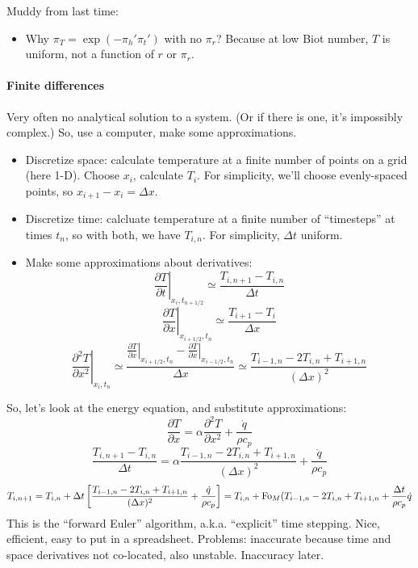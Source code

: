 \documentclass{report}
\begin{document}
\noindent Muddy from last time:
\begin{itemize}
\item Why $\pi_T=\exp(-\pi_h'\pi_t')$ with no $\pi_r$?  Because at low Biot
  number, $T$ is uniform, not a function of $r$ or $\pi_r$.
\end{itemize}

\paragraph{Finite differences}
Very often no analytical solution to a system.  (Or if there is one, it's
impossibly complex.)  So, use a computer, make some approximations.
\begin{itemize}
\item Discretize space: calculate temperature at a finite number of points on a
  grid (here 1-D).  Choose $x_i$, calculate $T_i$.  For simplicity, we'll
  choose evenly-spaced points, so $x_{i+1}-x_i=\Delta x$.
\item Discretize time: calcluate temperature at a finite number of
  ``timesteps'' at times $t_n$, so with both, we have $T_{i,n}$.  For
  simplicity, $\Delta t$ uniform.
\item Make some approximations about derivatives:
  $$\left.\frac{\partial T}{\partial t}\right|_{x_i, t_{n+1/2}} \simeq
  \frac{T_{i,n+1} - T_{i,n}}{\Delta t}$$
  $$\left.\frac{\partial T}{\partial x}\right|_{x_{i+1/2}, t_n} \simeq
  \frac{T_{i+1}-T_i}{\Delta x}$$
  $$\left.\frac{\partial^2 T}{\partial x^2}\right|_{x_i, t_n} \simeq
  \frac{\left.\frac{\partial T}{\partial x}\right|_{x_{i+1/2}, t_n} -
    \left.\frac{\partial T}{\partial x}\right|_{x_{i-1/2}, t_n}}
  {\Delta x} \simeq
  \frac{T_{i-1,n} - 2T_{i,n} + T_{i+1,n}}{(\Delta x)^2}$$
\end{itemize}

So, let's look at the energy equation, and substitute approximations:
$$\frac{\partial T}{\partial x} = \alpha\frac{\partial^2 T}{\partial x^2} +
\frac{\dot{q}}{\rho c_p}$$
$$\frac{T_{i,n+1} - T_{i,n}}{\Delta t} =
\alpha \frac{T_{i-1,n} - 2T_{i,n} + T_{i+1,n}}{(\Delta x)^2} +
\frac{\dot{q}}{\rho c_p}$$
$$T_{i,n+1} = T_{i,n} + \Delta t \left[
  \frac{T_{i-1,n} - 2T_{i,n} + T_{i+1,n}}{(\Delta x)^2} +
  \frac{\dot{q}}{\rho c_p}\right] =
T_{i,n} + {\rm Fo}_M (T_{i-1,n} - 2T_{i,n} + T_{i+1,n} +
\frac{\Delta t}{\rho c_p}\dot{q}$$
This is the ``forward Euler'' algorithm, a.k.a. ``explicit'' time stepping.
Nice, efficient, easy to put in a spreadsheet.  Problems: inaccurate because
time and space derivatives not co-located, also unstable.  Inaccuracy later.
\end{document}
